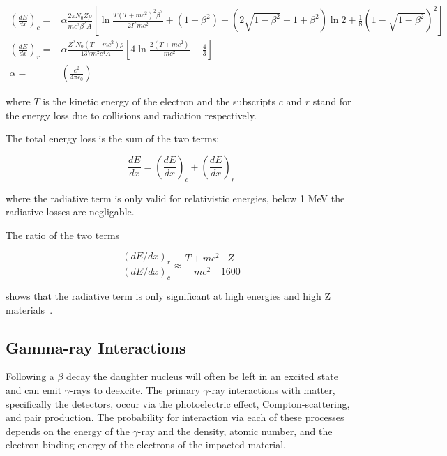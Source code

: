 \documentclass[cnatzke_thesis_proposal.tex]{subfiles}
\begin{document}
\begin{align}
    \left(\frac{dE}{dx}\right)_c ={}& \alpha \frac{2 \pi N_0 Z \rho}{m c^2 \beta^2 A} \left[ \ln \frac{T(T + m c^2)^2 \beta^2}{2 I^2 m c^2} + (1 - \beta^2) - (2\sqrt{1 - \beta^2} - 1 + \beta^2) \ln2 + \frac{1}{8}(1 - \sqrt{1 - \beta^2})^2 \right] \\
    \left(\frac{dE}{dx}\right)_r ={}& \alpha \frac{Z^2 N_0 (T + m c^2) \rho}{137 m^2 c^4 A} \left[4 \ln \frac{2(T + m c^2)}{m c^2} - \frac{4}{3} \right] \\
    \alpha = {}& \left(\frac{e^2}{4 \pi \epsilon_0}\right)
\end{align}

where $T$ is the kinetic energy of the electron and the subscripts $c$ and $r$ stand for the energy loss due to collisions and radiation respectively. 

The total energy loss is the sum of the two terms: 

\begin{equation}
    \frac{dE}{dx} = \left(\frac{dE}{dx}\right)_c + \left(\frac{dE}{dx}\right)_r 
\end{equation}

where the radiative term is only valid for relativistic energies, below 1 MeV the radiative losses are negligable.

The ratio of the two terms 

\begin{equation}
    \frac{(dE/dx)_r}{(dE/dx)_c} \approx \frac{T + mc^2}{mc^2} \frac{Z}{1600}
\end{equation}

shows that the radiative term is only significant at high energies and high Z materials~\cite{krane_introductory_1987}.

\subsection{Gamma-ray Interactions}
Following a $\beta$ decay the daughter nucleus will often be left in an excited state and can emit $\gamma$-rays to deexcite. The primary $\gamma$-ray interactions with matter, specifically the detectors, occur via the photoelectric effect, Compton-scattering, and pair production. The probability for interaction via each of these processes depends on the energy of the $\gamma$-ray and the density, atomic number, and the electron binding energy of the electrons of the impacted material.
\end{document}
